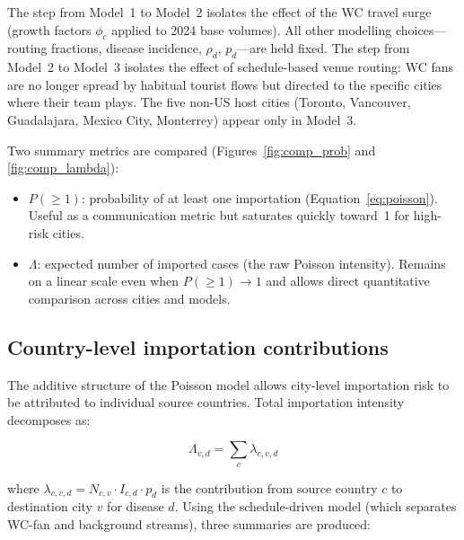 \documentclass[12pt]{article}
\begin{document}
The step from Model~1 to Model~2 isolates the effect of the WC travel
surge (growth factors $\phi_c$ applied to 2024 base volumes). All
other modelling choices---routing fractions, disease incidence,
$\rho_d$, $p_d$---are held fixed.
The step from Model~2 to Model~3 isolates the effect of schedule-based
venue routing: WC fans are no longer spread by habitual tourist flows
but directed to the specific cities where their team plays. The five
non-US host cities (Toronto, Vancouver, Guadalajara, Mexico City,
Monterrey) appear only in Model~3.

Two summary metrics are compared (Figures~\ref{fig:comp_prob} and
\ref{fig:comp_lambda}):
\begin{itemize}
  \item $P(\geq 1)$: probability of at least one importation
    (Equation~\ref{eq:poisson}). Useful as a communication metric but
    saturates quickly toward~1 for high-risk cities.
  \item $\Lambda$: expected number of imported cases (the raw Poisson
    intensity). Remains on a linear scale even when $P(\geq 1) \to 1$
    and allows direct quantitative comparison across cities and models.
\end{itemize}

\subsection*{Country-level importation contributions}

The additive structure of the Poisson model allows city-level
importation risk to be attributed to individual source countries.
Total importation intensity decomposes as:

\begin{equation}
  \Lambda_{v,d} = \sum_c \lambda_{c,v,d}
  \label{eq:decompose}
\end{equation}

where $\lambda_{c,v,d} = N_{c,v} \cdot I_{c,d} \cdot p_d$ is the
contribution from source country $c$ to destination city $v$ for
disease $d$. Using the schedule-driven model (which separates WC-fan
and background streams), three summaries are produced:
\end{document}

